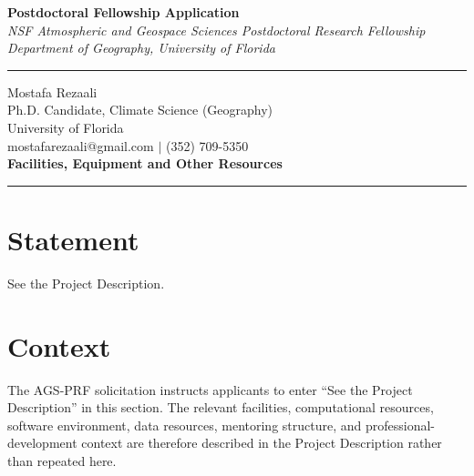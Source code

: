 \documentclass[11pt,letterpaper]{article}
\begin{document}
\begin{center}
    \vspace*{-1.5cm}
    {\Large\bfseries Postdoctoral Fellowship Application} \\[0.2cm]
    {\small\textit{NSF Atmospheric and Geospace Sciences Postdoctoral Research Fellowship}} \\[0.05cm]
    {\small\textit{Department of Geography, University of Florida}} \\[0.1cm]
    \rule{0.6\textwidth}{0.4pt}
\end{center}
\vspace{-0.5cm}

\noindent
Mostafa Rezaali \\
Ph.D. Candidate, Climate Science (Geography) \\
University of Florida \\
mostafarezaali@gmail.com \quad $\mid$ \quad (352) 709-5350 \\[0.3cm]
{\large\bfseries Facilities, Equipment and Other Resources}\\[-0.15cm]
\rule{\textwidth}{0.4pt}

\section*{Statement}
See the Project Description.

\section*{Context}
The AGS-PRF solicitation instructs applicants to enter ``See the Project Description'' in this section. The relevant facilities, computational resources, software environment, data resources, mentoring structure, and professional-development context are therefore described in the Project Description rather than repeated here.
\end{document}
